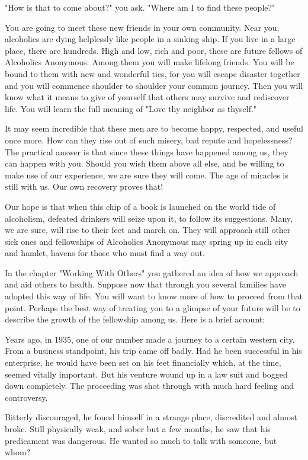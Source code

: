\begin{biblechapter}
"How is that to come about?" you ask.  "Where am I to find these people?"

You are going to meet these new friends in your own community.  Near you, alcoholics are dying helplessly like people in a sinking ship.  If you live in a large place, there are hundreds.  High and low, rich and poor, these are future fellows of Alcoholics Anonymous.  Among them you will make lifelong friends.  You will be bound to them with new and wonderful ties, for you will escape disaster together and you will commence shoulder to shoulder your common journey.  Then you will know what it means to give of yourself that others may survive and rediscover life.  You will learn the full meaning of "Love thy neighbor as thyself."

It may seem incredible that these men are to become happy, respected, and useful once more.  How can they rise out of such misery, bad repute and hopelessness?  The practical answer is that since these things have happened among us, they can happen with you.  Should you wish them above all else, and be willing to make use of our experience, we are sure they will come.  The age of miracles is still with us.  Our own recovery proves that!

Our hope is that when this chip of a book is launched on the world tide of alcoholism, defeated drinkers will seize upon it, to follow its suggestions.  Many, we are sure, will rise to their feet and march on.  They will approach still other sick ones and fellowships of Alcoholics Anonymous may spring up in each city and hamlet, havens for those who must find a way out.

In the chapter "Working With Others" you gathered an idea of how we approach and aid others to health.  Suppose now that through you several families have adopted this way of life.  You will want to know more of how to proceed from that point.  Perhaps the best way of treating you to a glimpse of your future will be to describe the growth of the fellowship among us.  Here is a brief account:

Years ago, in 1935, one of our number made a journey to a certain western city.  From a business standpoint, his trip came off badly.  Had he been successful in his enterprise, he would have  been set on his feet financially which, at the time, seemed vitally important.  But his venture wound up in a law suit and bogged down completely.  The proceeding was shot through with much hard feeling and controversy.

Bitterly discouraged, he found himself in a strange place, discredited and almost broke.  Still physically weak, and sober but a few months, he saw that his predicament was dangerous.  He wanted so much to talk with someone, but whom?


\end{biblechapter}
